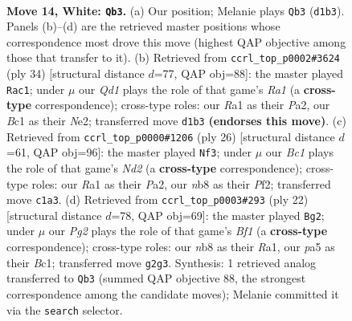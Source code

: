 \documentclass[11pt]{article}
\begin{document}
\clearpage

\begin{figure}[p]\centering
\begin{subfigure}{0.46\textwidth}\centering
\resizebox{\linewidth}{!}{%
\newchessgame
\chessboard[
  setfen={rnbqk2r/1p2p1b1/8/p5pp/3PB3/8/P2N1PPP/R1BQ1RK1 w kq - 0 14},
  showmover=false,
  pgfstyle=straightmove, color=movearrow, markmove={d1-b3}
]}
\caption{}
\end{subfigure}\hfill
\begin{subfigure}{0.46\textwidth}\centering
\resizebox{\linewidth}{!}{%
\newchessgame
\chessboard[
  setfen={r1bq1rk1/pp2p2p/5bp1/8/3PB3/4Q3/P3NPPP/R4RK1 w - - 0 18},
  showmover=false,
  pgfstyle=straightmove, color=movearrow, markmove={a1-c1}
]}
\caption{}
\end{subfigure}
\\[4pt]
\begin{subfigure}{0.46\textwidth}\centering
\resizebox{\linewidth}{!}{%
\newchessgame
\chessboard[
  setfen={r1bqk1nr/1p2p2p/p5p1/3pb3/8/3B4/PP1N1PPP/R1BQ1RK1 w kq - 0 14},
  showmover=false,
  pgfstyle=straightmove, color=movearrow, markmove={d2-f3}
]}
\caption{}
\end{subfigure}\hfill
\begin{subfigure}{0.46\textwidth}\centering
\resizebox{\linewidth}{!}{%
\newchessgame
\chessboard[
  setfen={rnbqk2r/1p3pp1/p7/2bp3P/8/7P/PPP1NP2/R1BQKB1R w KQkq - 1 12},
  showmover=false,
  pgfstyle=straightmove, color=movearrow, markmove={f1-g2}
]}
\caption{}
\end{subfigure}
\caption{\textbf{Move 14, White: \texttt{Qb3}.} (a) Our position; Melanie plays \texttt{Qb3} (\texttt{d1b3}). Panels (b)--(d) are the retrieved master positions whose correspondence most drove this move (highest QAP objective among those that transfer to it). (b) Retrieved from \texttt{ccrl\_top\_p0002\#3624} (ply 34) [structural distance $d$=77, QAP obj=88]: the master played \texttt{Rac1}; under $\mu$ our \emph{Qd1} plays the role of that game's \emph{Ra1} (a \textbf{cross-type} correspondence); cross-type roles: our \emph{R}a1 as their \emph{P}a2, our \emph{B}c1 as their \emph{N}e2; transferred move \texttt{d1b3} \textbf{(endorses this move)}. (c) Retrieved from \texttt{ccrl\_top\_p0000\#1206} (ply 26) [structural distance $d$=61, QAP obj=96]: the master played \texttt{Nf3}; under $\mu$ our \emph{Bc1} plays the role of that game's \emph{Nd2} (a \textbf{cross-type} correspondence); cross-type roles: our \emph{R}a1 as their \emph{P}a2, our \emph{n}b8 as their \emph{P}f2; transferred move \texttt{c1a3}. (d) Retrieved from \texttt{ccrl\_top\_p0003\#293} (ply 22) [structural distance $d$=78, QAP obj=69]: the master played \texttt{Bg2}; under $\mu$ our \emph{Pg2} plays the role of that game's \emph{Bf1} (a \textbf{cross-type} correspondence); cross-type roles: our \emph{n}b8 as their \emph{R}a1, our \emph{p}a5 as their \emph{B}c1; transferred move \texttt{g2g3}. Synthesis: 1 retrieved analog transferred to \texttt{Qb3} (summed QAP objective 88, the strongest correspondence among the candidate moves); Melanie committed it via the \texttt{search} selector.}
\label{fig:thought-m26}
\end{figure}
\end{document}
